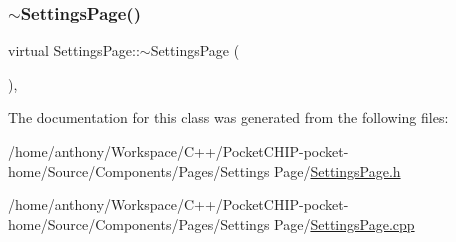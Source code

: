 \mbox{\label{classSettingsPage_a8a701f428dab2af143f68bc855555fc0}} 
\subsubsection{\texorpdfstring{$\sim$\+Settings\+Page()}{~SettingsPage()}}
{\footnotesize\ttfamily virtual Settings\+Page\+::$\sim$\+Settings\+Page (\begin{DoxyParamCaption}{ }\end{DoxyParamCaption})\hspace{0.3cm}{\ttfamily [inline]}, {\ttfamily [virtual]}}



The documentation for this class was generated from the following files\+:\begin{DoxyCompactItemize}
\item 
/home/anthony/\+Workspace/\+C++/\+Pocket\+C\+H\+I\+P-\/pocket-\/home/\+Source/\+Components/\+Pages/\+Settings Page/\mbox{\hyperlink{SettingsPage_8h}{Settings\+Page.\+h}}\item 
/home/anthony/\+Workspace/\+C++/\+Pocket\+C\+H\+I\+P-\/pocket-\/home/\+Source/\+Components/\+Pages/\+Settings Page/\mbox{\hyperlink{SettingsPage_8cpp}{Settings\+Page.\+cpp}}\end{DoxyCompactItemize}
